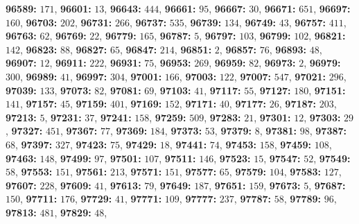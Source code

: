 \textsf{\bfseries 96589:} $171$, \textsf{\bfseries 96601:} $13$, \textsf{\bfseries 96643:} $444$, \textsf{\bfseries 96661:} $95$, \textsf{\bfseries 96667:} $30$, \textsf{\bfseries 96671:} $651$, \textsf{\bfseries 96697:} $160$, \textsf{\bfseries 96703:} $202$, \textsf{\bfseries 96731:} $266$, \textsf{\bfseries 96737:} $535$, \textsf{\bfseries 96739:} $134$, \textsf{\bfseries 96749:} $43$, \textsf{\bfseries 96757:} $411$, \textsf{\bfseries 96763:} $62$, \textsf{\bfseries 96769:} $22$, \textsf{\bfseries 96779:} $165$, \textsf{\bfseries 96787:} $5$, \textsf{\bfseries 96797:} $103$, \textsf{\bfseries 96799:} $102$, \textsf{\bfseries 96821:} $142$, \textsf{\bfseries 96823:} $88$, \textsf{\bfseries 96827:} $65$, \textsf{\bfseries 96847:} $214$, \textsf{\bfseries 96851:} $2$, \textsf{\bfseries 96857:} $76$, \textsf{\bfseries 96893:} $48$, \textsf{\bfseries 96907:} $12$, \textsf{\bfseries 96911:} $222$, \textsf{\bfseries 96931:} $75$, \textsf{\bfseries 96953:} $269$, \textsf{\bfseries 96959:} $82$, \textsf{\bfseries 96973:} $2$, \textsf{\bfseries 96979:} $300$, \textsf{\bfseries 96989:} $41$, \textsf{\bfseries 96997:} $304$, \textsf{\bfseries 97001:} $166$, \textsf{\bfseries 97003:} $122$, \textsf{\bfseries 97007:} $547$, \textsf{\bfseries 97021:} $296$, \textsf{\bfseries 97039:} $133$, \textsf{\bfseries 97073:} $82$, \textsf{\bfseries 97081:} $69$, \textsf{\bfseries 97103:} $41$, \textsf{\bfseries 97117:} $55$, \textsf{\bfseries 97127:} $180$, \textsf{\bfseries 97151:} $141$, \textsf{\bfseries 97157:} $45$, \textsf{\bfseries 97159:} $401$, \textsf{\bfseries 97169:} $152$, \textsf{\bfseries 97171:} $40$, \textsf{\bfseries 97177:} $26$, \textsf{\bfseries 97187:} $203$, \textsf{\bfseries 97213:} $5$, \textsf{\bfseries 97231:} $37$, \textsf{\bfseries 97241:} $158$, \textsf{\bfseries 97259:} $509$, \textsf{\bfseries 97283:} $21$, \textsf{\bfseries 97301:} $12$, \textsf{\bfseries 97303:} $29$, \textsf{\bfseries 97327:} $451$, \textsf{\bfseries 97367:} $77$, \textsf{\bfseries 97369:} $184$, \textsf{\bfseries 97373:} $53$, \textsf{\bfseries 97379:} $8$, \textsf{\bfseries 97381:} $98$, \textsf{\bfseries 97387:} $68$, \textsf{\bfseries 97397:} $327$, \textsf{\bfseries 97423:} $75$, \textsf{\bfseries 97429:} $18$, \textsf{\bfseries 97441:} $74$, \textsf{\bfseries 97453:} $158$, \textsf{\bfseries 97459:} $108$, \textsf{\bfseries 97463:} $148$, \textsf{\bfseries 97499:} $97$, \textsf{\bfseries 97501:} $107$, \textsf{\bfseries 97511:} $146$, \textsf{\bfseries 97523:} $15$, \textsf{\bfseries 97547:} $52$, \textsf{\bfseries 97549:} $58$, \textsf{\bfseries 97553:} $151$, \textsf{\bfseries 97561:} $213$, \textsf{\bfseries 97571:} $151$, \textsf{\bfseries 97577:} $65$, \textsf{\bfseries 97579:} $104$, \textsf{\bfseries 97583:} $127$, \textsf{\bfseries 97607:} $228$, \textsf{\bfseries 97609:} $41$, \textsf{\bfseries 97613:} $79$, \textsf{\bfseries 97649:} $187$, \textsf{\bfseries 97651:} $159$, \textsf{\bfseries 97673:} $5$, \textsf{\bfseries 97687:} $150$, \textsf{\bfseries 97711:} $176$, \textsf{\bfseries 97729:} $41$, \textsf{\bfseries 97771:} $109$, \textsf{\bfseries 97777:} $237$, \textsf{\bfseries 97787:} $58$, \textsf{\bfseries 97789:} $96$, \textsf{\bfseries 97813:} $481$, \textsf{\bfseries 97829:} $48$, 
